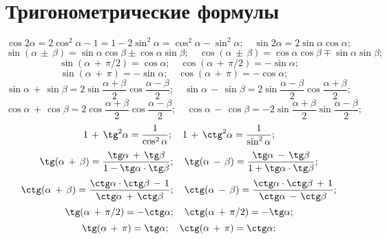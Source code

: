 \section{Тригонометрические формулы}
\[ \cos2\alpha=2\cos^2{\alpha}-1=1-2\sin^2{\alpha}=\cos^2{\alpha}-\sin^2{\alpha}; \quad \sin{2\alpha}=2\sin\alpha\cos\alpha;\] \vspace{0.1mm}
\[ \sin(\alpha\,\pm\,\beta)=\sin\alpha\cos\beta \pm \cos\alpha\sin\beta; \quad \cos(\alpha\,\pm\,\beta)=\cos\alpha\cos\beta \mp \sin\alpha\sin\beta; \] \vspace{0.1mm}
\[ \sin(\alpha\,+\,\pi/2)=\cos\alpha; \quad \cos(\alpha\,+\,\pi/2)=-\sin\alpha; \] \vspace{0.1mm}
\[ \sin(\alpha\,+\,\pi)=-\sin\alpha; \quad \cos(\alpha\,+\,\pi)=-\cos\alpha; \quad \] \vspace{0.1mm}
\[ \sin\alpha\,+\,\sin\beta= 2\sin{\dfrac{\alpha+\beta}{2}}\cos{\dfrac{\alpha-\beta}{2}}; \quad \sin\alpha\,-\,\sin\beta= 2\sin{\dfrac{\alpha-\beta}{2}}\cos{\dfrac{\alpha+\beta}{2}};\] \vspace{0.1mm}
\[ \cos\alpha\,+\,\cos\beta= 2\cos{\dfrac{\alpha+\beta}{2}}\cos{\dfrac{\alpha-\beta}{2}}; \quad \cos\alpha\,-\,\cos\beta= -2\sin{\dfrac{\alpha+\beta}{2}}\sin{\dfrac{\alpha-\beta}{2}};\] \vspace{0.1mm}
\[ 1\,+\,\tg ^2\alpha=\dfrac{1}{\cos^2\alpha}; \quad 1\,+\,\ctg ^2\alpha=\dfrac{1}{\sin^2\alpha}; \] \vspace{0.1mm}
\[ \tg (\alpha\,+\,\beta)=\dfrac{\tg \alpha\,+\, \tg \beta}{1-\tg \alpha \cdot \tg \beta}; \quad \tg (\alpha\,-\,\beta)=\dfrac{\tg \alpha\,-\, \tg \beta}{1+\tg \alpha \cdot \tg \beta}; \] \vspace{0.1mm}
\[ \ctg (\alpha\,+\,\beta)=\dfrac{\ctg \alpha\cdot \ctg \beta\,-\,1}{\ctg \alpha\,+\,\ctg \beta}; \quad \ctg (\alpha\,-\,\beta)=\dfrac{\ctg \alpha\cdot \ctg \beta\,+\,1}{\ctg \alpha\,-\,\ctg \beta}; \] \vspace{0.1mm}
\[ \tg (\alpha\,+\,\pi/2)=-\ctg \alpha; \quad \ctg(\alpha\,+\,\pi/2)=-\tg \alpha; \] \vspace{0.1mm}
\[ \tg (\alpha\,+\,\pi)=\tg \alpha; \quad \ctg(\alpha\,+\,\pi)=\ctg \alpha; \] \vspace{0.1mm}
\vspace{0.1mm}


